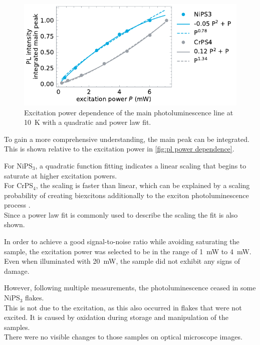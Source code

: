 \documentclass[
	oneside,
	parskip=half,
	a4paper,
]{scrbook}
\begin{document}
\begin{figure}
	\centering
	\includegraphics{../figures/2024-04-19 excitation power dependence of main pl line.pdf}
	\caption{Excitation power dependence of the main photoluminescence line at \SI{10}{K} with a quadratic and power law fit. }
	\label{fig:pl power dependence}
\end{figure}
To gain a more comprehensive understanding, the main peak can be integrated.
This is shown relative to the excitation power in \autoref{fig:pl power dependence}.

For NiPS$_3$, a quadratic function fitting indicates a linear scaling that begins to saturate at higher excitation powers.\\
For CrPS$_4$, the scaling is faster than linear, which can be explained by a scaling probability of creating biexcitons additionally to the exciton photoluminescence process \cite{biexciton}. \\
Since a power law fit is commonly used to describe the scaling the fit is also shown.

In order to achieve a good signal-to-noise ratio while avoiding saturating the sample, the excitation power was selected to be in the range of \SI{1}{mW} to \SI{4}{mW}.\\
Even when illuminated with \SI{20}{mW}, the sample did not exhibit any signs of damage.

However, following multiple measurements, the photoluminescence ceased in some NiPS$_3$ flakes.\\
This is not due to the excitation, as this also occurred in flakes that were not excited.
It is caused by oxidation during storage and manipulation of the samples.\\
There were no visible changes to those samples on optical microscope images.
\end{document}
